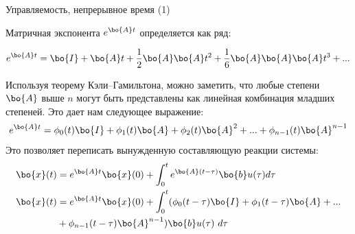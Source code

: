 \documentclass{beamer}
\begin{document}
\begin{frame}{Управляемость, непрерывное время (1)}
	\begin{flushleft}
		
		Матричная экспонента $e^{\bo{A}t}$ определяется как ряд:
		
		\begin{equation}
			e^{\bo{A}t} = \bo{I}+\bo{A}t+\frac{1}{2} \bo{A}\bo{A}t^2
			+\frac{1}{6} \bo{A}\bo{A}\bo{A}t^3 + ...
		\end{equation}
		
		Используя теорему Кэли–Гамильтона, можно заметить, что любые степени $\bo{A}$ выше $n$ могут быть представлены как линейная комбинация младших степеней. Это дает нам следующее выражение:
		\begin{equation}
			e^{\bo{A}t} = \phi_0(t)\bo{I}+\phi_1(t)\bo{A}+\phi_2(t) \bo{A}^2 + ...
			+ \phi_{n-1}(t) \bo{A}^{n-1}
		\end{equation}
		Это позволяет переписать вынужденную составляющую реакции системы:
		\begin{align*}
			\bo{x}(t) &= e^{\bo{A}t}  \bo{x}(0) + 
			\int_{0}^{t} e^{\bo{A}(t-\tau)} \bo{b}  u(\tau) d\tau
			\\
			\bo{x}(t) &= e^{\bo{A}t}  \bo{x}(0) + 
			\int_{0}^{t} 
			( \phi_0(t-\tau)\bo{I}+\phi_1(t-\tau)\bo{A}+ ... 
			\\
			&+ \phi_{n-1}(t-\tau) \bo{A}^{n-1} ) 
			\bo{b}  u(\tau) \ d\tau
		\end{align*}
		
		
	\end{flushleft}
\end{frame}
\end{document}
